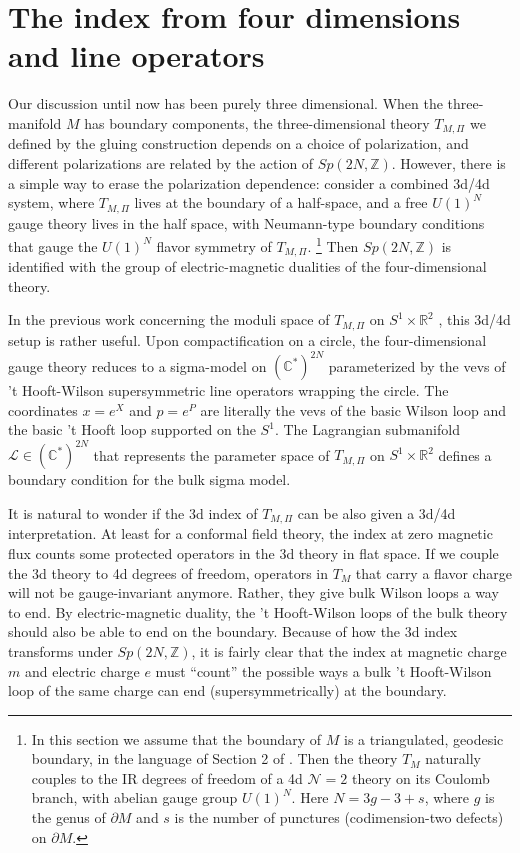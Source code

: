 \documentclass[11pt,letterpaper]{article}
\numberwithin{equation}{section}
\newcommand{\Z}{{\mathbb Z}}
\newcommand{\R}{{\mathbb R}}
\newcommand{\C}{{\mathbb C}}
\newcommand{\pd}{\partial}
\newcommand{\CL}{\mathcal{L}}
\newcommand{\CN}{\mathcal{N}}
\begin{document}
\section{The index from four dimensions and line operators}
\label{sec:3d4d}



Our discussion until now has been purely three dimensional. When the three-manifold $M$ has boundary components,
the three-dimensional theory $T_{M,\Pi}$ we defined by the gluing construction depends on a choice of polarization,
and different polarizations are related by the action of $Sp(2N,\Z)$.
%
However, there is a simple way to erase the polarization dependence: consider a combined 3d/4d system,
where $T_{M,\Pi}$ lives at the boundary of a half-space,
and a free $U(1)^N$ gauge theory lives in the half space,
with Neumann-type boundary conditions that gauge the $U(1)^N$ flavor symmetry of $T_{M,\Pi}$.%
%
\footnote{In this section we assume that the boundary of $M$ is a triangulated, geodesic boundary, in the language of Section 2 of \cite{DGG}. Then the theory $T_M$ naturally couples to the IR degrees of freedom of a 4d $\CN=2$ theory on its Coulomb branch, with abelian gauge group $U(1)^N$. Here $N = 3g-3+s$, where $g$ is the genus of $\pd M$ and $s$ is the number of punctures (codimension-two defects) on $\pd M$.} %
%
Then  $Sp(2N,\Z)$ is identified with the group of electric-magnetic dualities of the four-dimensional theory.

In the previous work concerning the moduli space of
$T_{M,\Pi}$ on $S^1 \times \R^2$ \cite{DGH, DGG}, this 3d/4d setup is rather useful. Upon compactification on a circle,
the four-dimensional gauge theory reduces to a sigma-model on $(\C^*)^{2N}$ parameterized by
the vevs of 't Hooft-Wilson supersymmetric line operators wrapping the circle.
The coordinates $x=e^X$ and $p=e^P$ are literally the vevs of the basic Wilson loop and the basic 't Hooft loop supported on the $S^1$.
The Lagrangian submanifold $\CL \in (\C^*)^{2N}$ that represents the parameter space of $T_{M,\Pi}$ on $S^1 \times \R^2$
defines a boundary condition for the bulk sigma model.

It is natural to wonder if the 3d index of $T_{M,\Pi}$ can be also given a 3d/4d interpretation.
At least for a conformal field theory, the index at zero magnetic flux counts some protected operators in the 3d theory in flat space.
If we couple the 3d theory to 4d degrees of freedom, operators in $T_M$ that carry a flavor charge
will not be gauge-invariant anymore. Rather, they give bulk Wilson loops a way to end.
By electric-magnetic duality, the 't Hooft-Wilson loops of the bulk theory should also be able to end on the boundary.
Because of how the 3d index transforms under $Sp(2N,\Z)$, it is fairly clear that the index at magnetic charge $m$
and electric charge $e$ must ``count'' the possible ways a bulk 't Hooft-Wilson loop of the same charge can end (supersymmetrically) at the boundary.
\end{document}
